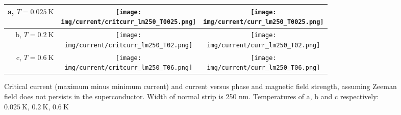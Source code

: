 \documentclass[10pt,a4paper]{article}
\newcommand{\img}{./images}
\begin{document}
		\begin{figure}[H]
			\begin{tabular}{rcc}
				a, $T=\SI{0.025}{\K}$&\texttt{[image: \\img/current/critcurr\_lm250\_T0025.png]}&
				\texttt{[image: \\img/current/curr\_lm250\_T0025.png]}\\
				\hline
				b, $T=\SI{0.2}{\K}$&\texttt{[image: \\img/current/critcurr\_lm250\_T02.png]}&
				\texttt{[image: \\img/current/curr\_lm250\_T02.png]}\\
				\hline
				c, $T=\SI{0.6}{\K}$&\texttt{[image: \\img/current/critcurr\_lm250\_T06.png]}&
				\texttt{[image: \\img/current/curr\_lm250\_T06.png]}\\
				\hline
			\end{tabular}
			\caption{Critical current (maximum minus minimum current) and current versus phase and magnetic field strength, assuming Zeeman field does not persists in the superconductor. Width of normal strip is 250 nm. Temperatures of a, b and c respectively: $\SI{0.025}{\K}$, $\SI{0.2}{\K}$, $\SI{0.6}{\K}$}
		\end{figure}
\clearpage
\printglossaries
\end{document}
